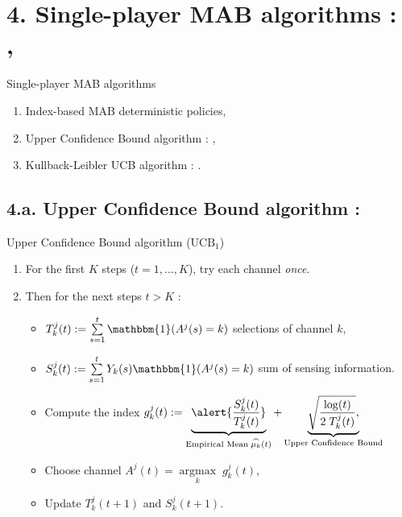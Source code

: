 \documentclass[12pt,english,ignorenonframetext,aspectratio=169,]{beamer}
\providecommand{\tightlist}{%
  \setlength{\itemsep}{0pt}\setlength{\parskip}{0pt}}
\begin{document}
\section{\hfill{}4. Single-player MAB algorithms : \UCB, \klUCB\hfill{}}

\begin{frame}{Single-player MAB algorithms}

\begin{enumerate}
\def\labelenumi{\arabic{enumi}.}
\tightlist
\item
  Index-based MAB deterministic policies,\vspace*{15pt}
\item
  Upper Confidence Bound algorithm : \UCB,\vspace*{15pt}
\item
  Kullback-Leibler UCB algorithm : \klUCB.
\end{enumerate}

\end{frame}



\subsection{\hfill{}4.a. Upper Confidence Bound algorithm : \UCB\hfill{}}

\begin{frame}{Upper Confidence Bound algorithm (\(\mathrm{UCB}_1\))}

\begin{enumerate}
\def\labelenumi{\arabic{enumi}.}
\tightlist
\item
  For the first \(K\) steps (\(t=1,\dots,K\)), try each channel
  \emph{once}.
\item
  Then for the next steps \(t > K\) :

  \begin{itemize}
  \tightlist
  \item
  \(T_k^j(t) := \sum\limits_{s=1}^{t} \mathbbm{1}(A^j(s) = k)\) selections of channel \(k\),
  \item
  \(S_k^j(t) := \sum\limits_{s=1}^{t} Y_{k}(s) \mathbbm{1}(A^j(s) = k)\) sum of sensing information.\pause
  \item
    Compute the index
    \(g_k^j(t) := \underbrace{\alert{\frac{S_k^j(t)}{T_k^j(t)}}}_{\text{Empirical Mean}\; \widehat{\mu_k}(t)} + \underbrace{\sqrt{\frac{\log(t)}{2 \; T_k^j(t)}},}_{\text{Upper Confidence Bound}}\)\pause
  \item
    Choose channel \(A^j(t) = \mathop{\arg\max}\limits_{k} \; g_k^j(t)\),
  \item
    Update \(T_k^j(t+1)\) and \(S_k^j(t+1)\).
  \end{itemize}
\end{enumerate}


\end{frame}
\end{document}
